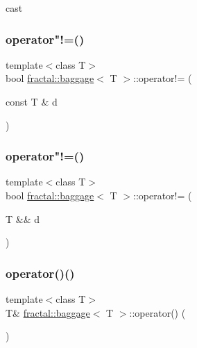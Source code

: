 cast 

\mbox{\label{classfractal_1_1baggage_a50e3b632e7803018ac854dcfd9d9d2f5}} 
\subsubsection{\texorpdfstring{operator"!=()}{operator!=()}\hspace{0.1cm}{\footnotesize\ttfamily [1/2]}}
{\footnotesize\ttfamily template$<$class T$>$ \\
bool \hyperlink{classfractal_1_1baggage}{fractal\+::baggage}$<$ T $>$\+::operator!= (\begin{DoxyParamCaption}\item[{const T \&}]{d }\end{DoxyParamCaption})\hspace{0.3cm}{\ttfamily [inline]}}

\mbox{\label{classfractal_1_1baggage_ac4ef57664b87f4042451bbf431e03fa2}} 
\subsubsection{\texorpdfstring{operator"!=()}{operator!=()}\hspace{0.1cm}{\footnotesize\ttfamily [2/2]}}
{\footnotesize\ttfamily template$<$class T$>$ \\
bool \hyperlink{classfractal_1_1baggage}{fractal\+::baggage}$<$ T $>$\+::operator!= (\begin{DoxyParamCaption}\item[{T \&\&}]{d }\end{DoxyParamCaption})\hspace{0.3cm}{\ttfamily [inline]}}

\mbox{\label{classfractal_1_1baggage_a1ce803eda450dd559aa9b9818b28cf5e}} 
\subsubsection{\texorpdfstring{operator()()}{operator()()}\hspace{0.1cm}{\footnotesize\ttfamily [1/3]}}
{\footnotesize\ttfamily template$<$class T$>$ \\
T\& \hyperlink{classfractal_1_1baggage}{fractal\+::baggage}$<$ T $>$\+::operator() (\begin{DoxyParamCaption}{ }\end{DoxyParamCaption})\hspace{0.3cm}{\ttfamily [inline]}}



